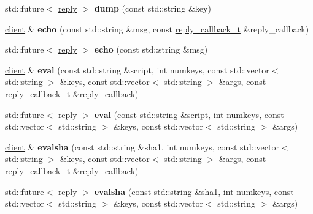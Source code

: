 \begin{DoxyCompactItemize}
std\+::future$<$ \hyperlink{classcpp__redis_1_1reply}{reply} $>$ {\bfseries dump} (const std\+::string \&key)
\item 
\mbox{\label{classcpp__redis_1_1client_a285d35a355052ae1757d13ecec0539e8}} 
\hyperlink{classcpp__redis_1_1client}{client} \& {\bfseries echo} (const std\+::string \&msg, const \hyperlink{classcpp__redis_1_1client_a061a1140d36d2eaeda82b09a0bb3f9f2}{reply\+\_\+callback\+\_\+t} \&reply\+\_\+callback)
\item 
\mbox{\label{classcpp__redis_1_1client_af0e3462a35f72aeae1527f0cb3cc8570}} 
std\+::future$<$ \hyperlink{classcpp__redis_1_1reply}{reply} $>$ {\bfseries echo} (const std\+::string \&msg)
\item 
\mbox{\label{classcpp__redis_1_1client_aeb773d0e0cacb766a0c4c7641bd91ebf}} 
\hyperlink{classcpp__redis_1_1client}{client} \& {\bfseries eval} (const std\+::string \&script, int numkeys, const std\+::vector$<$ std\+::string $>$ \&keys, const std\+::vector$<$ std\+::string $>$ \&args, const \hyperlink{classcpp__redis_1_1client_a061a1140d36d2eaeda82b09a0bb3f9f2}{reply\+\_\+callback\+\_\+t} \&reply\+\_\+callback)
\item 
\mbox{\label{classcpp__redis_1_1client_a01b328b664e5cf604150e3d0f881ff4c}} 
std\+::future$<$ \hyperlink{classcpp__redis_1_1reply}{reply} $>$ {\bfseries eval} (const std\+::string \&script, int numkeys, const std\+::vector$<$ std\+::string $>$ \&keys, const std\+::vector$<$ std\+::string $>$ \&args)
\item 
\mbox{\label{classcpp__redis_1_1client_a71cd73130b4755c9f4da3b602b09a1be}} 
\hyperlink{classcpp__redis_1_1client}{client} \& {\bfseries evalsha} (const std\+::string \&sha1, int numkeys, const std\+::vector$<$ std\+::string $>$ \&keys, const std\+::vector$<$ std\+::string $>$ \&args, const \hyperlink{classcpp__redis_1_1client_a061a1140d36d2eaeda82b09a0bb3f9f2}{reply\+\_\+callback\+\_\+t} \&reply\+\_\+callback)
\item 
\mbox{\label{classcpp__redis_1_1client_a3ab7684f292037dc3918c32549b7ad53}} 
std\+::future$<$ \hyperlink{classcpp__redis_1_1reply}{reply} $>$ {\bfseries evalsha} (const std\+::string \&sha1, int numkeys, const std\+::vector$<$ std\+::string $>$ \&keys, const std\+::vector$<$ std\+::string $>$ \&args)

\end{DoxyCompactItemize}
